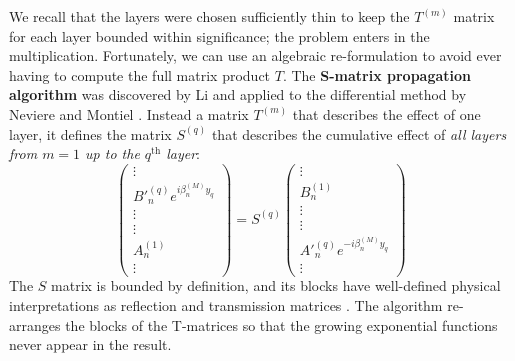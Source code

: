 We recall that the layers were chosen sufficiently thin to keep the $T^{(m)}$ matrix for each layer bounded within significance; the problem enters in the multiplication.  Fortunately, we can use an algebraic re-formulation to avoid ever having to compute the full matrix product $T$.  The \textbf{S-matrix propagation algorithm} was discovered by Li \cite{Li96} and applied to the differential method by Neviere and Montiel \cite{Nev96}.  Instead a matrix $T^{(m)}$ that describes the effect of one layer, it defines the matrix $S^{(q)}$ that describes the cumulative effect of \emph{all layers from $m=1$ up to the $q^\textrm{th}$ layer}:
\begin{equation}
 \left(\begin{array}{c}\vdots \\ B'^{(q)}_n  e^{i \beta^{(M)}_n y_q} \\ \vdots \\\hline \vdots \\ A^{(1)}_n \\ \vdots\end{array}\right) = S^{(q)} \left(\begin{array}{c}\vdots \\ B^{(1)}_n  \\ \vdots \\\hline \vdots \\ A'^{(q)}_n e^{-i \beta^{(M)}_n y_q} \\ \vdots\end{array}\right) 
 \label{sMatrixDef}
\end{equation}
The $S$ matrix is bounded by definition, and its blocks have well-defined physical interpretations as reflection and transmission matrices \cite[Chapter 3]{Nev02}.  The algorithm re-arranges the blocks of the T-matrices so that the growing exponential functions never appear in the result.

